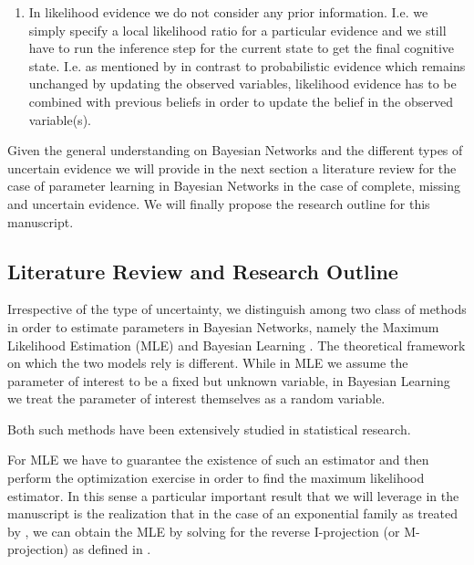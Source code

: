 \documentclass[11pt]{article}
\begin{document}
\begin{article}
\begin{enumerate}
\item In likelihood evidence we do not consider any prior
information. I.e. we simply specify a local likelihood ratio for
a particular evidence and we still have to run the inference step
for the current state to get the final cognitive state. I.e. as
mentioned by \cite{Mrad_2015} in contrast to probabilistic evidence
which remains unchanged by updating the observed variables,
likelihood evidence has to be combined with previous beliefs in
order to update the belief in the observed variable(s).
\end{enumerate}

Given the general understanding on Bayesian Networks and the
different types of uncertain evidence we will provide in the next
section a literature review for the case of parameter learning in
Bayesian Networks in the case of complete, missing and uncertain
evidence. We will finally propose the research outline for this
manuscript. 

\subsection{Literature Review and Research Outline}
\label{literature_review}
Irrespective of the type of uncertainty, we distinguish among two
class of methods in order to estimate parameters in Bayesian
Networks, namely the Maximum Likelihood Estimation (MLE)
\cite{spiegelhalter1990sequential} and Bayesian Learning
\cite{Smith_2001}. The theoretical framework on which the two models
rely is different. While in MLE we assume the parameter of
interest to be a fixed but unknown variable, in Bayesian Learning
we treat the parameter of interest themselves as a random
variable.

Both such methods have been extensively studied in statistical
research.

For MLE we have to guarantee the existence of such an estimator and
then perform the optimization exercise in order to find the maximum
likelihood estimator. In this sense a particular important result
that we will leverage in the manuscript is the realization that in
the case of an exponential family as treated by
\cite{barndorff1978hyperbolic}, we can obtain the MLE by solving for
the reverse I-projection (or M-projection) as defined in
\cite{csiszar1975divergence}.


\end{article}
\end{document}
